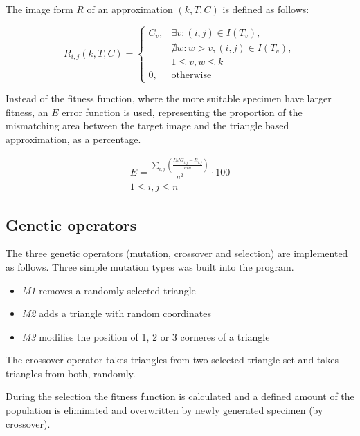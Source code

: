 \documentclass[conference]{IEEEtran}
\begin{document}
The image form $R$ of an approximation $(k, T, C)$ is defined as follows:

\begin{equation}
	R_{i,j}(k, T, C)=
	\begin{cases}
		C_v,& \exists v: (i, j) \in I(T_v),\\
		    & \nexists w: w>v, (i, j) \in I(T_v),\\
				&1 \leq v, w \leq k\\
		0,  & \text{otherwise}
	\end{cases}
\end{equation}

Instead of the fitness function, where the more suitable
specimen have larger fitness, an $E$ error function is used, representing
the proportion of the mismatching area between the target image and the triangle
based approximation, as a percentage.

\begin{equation}
	\begin{gathered}
		E = \frac{\sum_{i,j} \left( \frac{IMG_{i,j}-R_{i,j}}{mn} \right)}{n^2}\cdot 100\\
		1 \leq i,j \leq n
	\end{gathered}
\end{equation}

\subsection{Genetic operators}

The three genetic operators (mutation, crossover and selection)
are implemented as follows. Three simple mutation types was
built into the program.

\begin{itemize}

	\item{\emph{M1} removes a randomly selected triangle}

	\item{\emph{M2} adds a triangle with random coordinates}

	\item{\emph{M3} modifies the position of 1, 2 or 3 corneres of a triangle}

\end{itemize}

The crossover operator takes triangles from two selected triangle-set
and takes triangles from both, randomly.

During the selection the fitness function is calculated and a defined
amount of the population is eliminated and overwritten by
newly generated specimen (by crossover).
\end{document}
